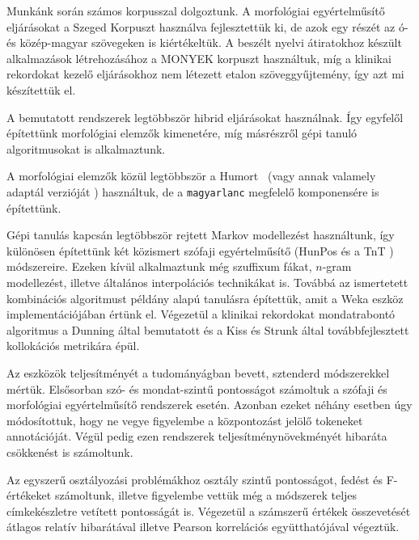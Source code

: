 Munkánk során számos korpusszal dolgoztunk.
A morfológiai egyértelműsítő eljárásokat a Szeged Korpuszt \cite{Csendes2004} használva fejlesztettük ki, de azok egy részét az ó- és közép-magyar szövegeken \cite{Novak2013} is kiértékeltük.
A beszélt nyelvi átiratokhoz készült alkalmazások létrehozásához a MONYEK korpuszt \cite{Matyus2014} használtuk, míg a klinikai rekordokat kezelő eljárásokhoz nem létezett etalon szöveggyűjtemény, így azt mi készítettük el.

A bemutatott rendszerek legtöbbször hibrid eljárásokat használnak. 
Így egyfelől építettünk morfológiai elemzők kimenetére, míg másrészről gépi tanuló algoritmusokat is alkalmaztunk.

A morfológiai elemzők közül legtöbbször a Humort~\cite{Proszeky1994,Novak2003,Proszeky2005} (vagy annak valamely adaptál verzióját \cite{Novak2013,NovakOMK,Orosz2013}) használtuk, de a \texttt{magyarlanc} \cite{zsibrata2013magyarlanc} megfelelő komponensére is építettünk. 

Gépi tanulás kapcsán legtöbbször rejtett Markov modellezést \cite{Rabiner1989,Samuelsson1993}  használtunk, így különösen építettünk két közismert szófaji egyértelműsítő (HunPos  \cite{Halacsy2007} és a TnT \cite{Brants2000}) módszereire.
Ezeken kívül alkalmaztunk még szuffixum fákat, $n$-gram modellezést, illetve általános interpolációs technikákat is.
Továbbá az ismertetett kombinációs algoritmust példány alapú tanulásra \cite{Aha1991} építettük, amit a Weka \cite{Hall2009} eszköz implementációjában értünk el.
Végezetül a klinikai rekordokat mondatrabontó algoritmus a Dunning által bemutatott \cite{dunning1993accurate} és a Kiss és Strunk által továbbfejlesztett \cite{kiss2006unsupervised} kollokációs metrikára épül.

Az eszközök teljesítményét a tudományágban bevett, sztenderd módszerekkel mértük.
Elsősorban szó- és mondat-szintű pontosságot számoltuk a szófaji és morfológiai egyértelműsítő rendszerek esetén.
Azonban ezeket néhány esetben úgy módosítottuk, hogy ne vegye figyelembe a központozást jelölő tokeneket annotációját.
Végül pedig ezen rendszerek teljesítménynövekményét hibaráta csökkenést is számoltunk.

Az egyszerű osztályozási problémákhoz osztály szintű pontosságot, fedést és F-értékeket számoltunk, illetve figyelembe vettük még a módszerek teljes címkekészletre vetített pontosságát is.
Végezetül a számszerű értékek összevetését átlagos relatív hibarátával \cite{Witten2011} illetve
Pearson korrelációs együtthatójával \cite{Witten2011} végeztük.